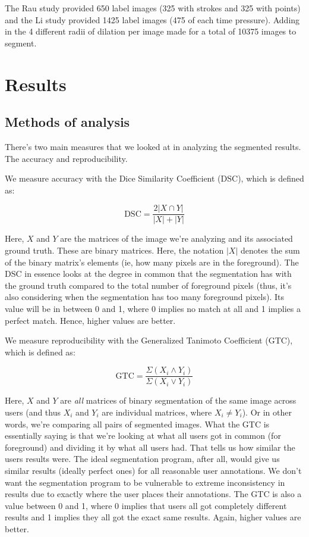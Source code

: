 \documentclass[12pt,a4paper,notitlepage]{article}
\begin{document}
The Rau study provided 650 label images (325 with strokes and 325 with points) and the Li study provided 1425 label images (475 of each time pressure). Adding in the 4 different radii of dilation per image made for a total of 10375 images to segment.

\section{Results}

\subsection{Methods of analysis}
There's two main measures that we looked at in analyzing the segmented results. The accuracy and reproducibility.

We measure accuracy with the Dice Similarity Coefficient (DSC), which is defined as\cite{dsc}:

$$\text{DSC} = \frac{2|X \cap Y|}{|X| + |Y|}$$

Here, $X$ and $Y$ are the matrices of the image we're analyzing and its associated ground truth. These are binary matrices. Here, the notation $|X|$ denotes the sum of the binary matrix's elements (ie, how many pixels are in the foreground). The DSC in essence looks at the degree in common that the segmentation has with the ground truth compared to the total number of foreground pixels (thus, it's also considering when the segmentation has too many foreground pixels). Its value will be in between 0 and 1, where 0 implies no match at all and 1 implies a perfect match. Hence, higher values are better.

We measure reproducibility with the Generalized Tanimoto Coefficient (GTC), which is defined as\cite{gtc}:

$$\text{GTC} = \frac{\Sigma \left( X_i \wedge Y_i \right)}{\Sigma \left( X_i \vee Y_i \right)}$$

Here, $X$ and $Y$ are \textit{all} matrices of binary segmentation of the same image across users (and thus $X_i$ and $Y_i$ are individual matrices, where $X_i \neq Y_i$). Or in other words, we're comparing all pairs of segmented images. What the GTC is essentially saying is that we're looking at what all users got in common (for foreground) and dividing it by what all users had. That tells us how similar the users results were. The ideal segmentation program, after all, would give us similar results (ideally perfect ones) for all reasonable user annotations. We don't want the segmentation program to be vulnerable to extreme inconsistency in results due to exactly where the user places their annotations. The GTC is also a value between 0 and 1, where 0 implies that users all got completely different results and 1 implies they all got the exact same results. Again, higher values are better.
\end{document}
